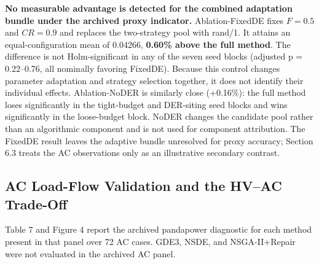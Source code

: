 \documentclass[energies,article,submit,moreauthors]{Definitions/mdpi}
\begin{document}
\textbf{No measurable advantage is detected for the combined adaptation bundle under the archived proxy indicator.} Ablation-FixedDE fixes \(F = 0.5\) and \(CR = 0.9\) and replaces the two-strategy pool with rand/1. It attains an equal-configuration mean of 0.04266, \textbf{0.60\% above the full method}. The difference is not Holm-significant in any of the seven seed blocks (adjusted p = 0.22--0.76, all nominally favoring FixedDE). Because this control changes parameter adaptation and strategy selection together, it does not identify their individual effects. Ablation-NoDER is similarly close (+0.16\%): the full method loses significantly in the tight-budget and DER-siting seed blocks and wins significantly in the loose-budget block. NoDER changes the candidate pool rather than an algorithmic component and is not used for component attribution. The FixedDE result leaves the adaptive bundle unresolved for proxy accuracy; Section 6.3 treats the AC observations only as an illustrative secondary contrast.

\subsection{AC Load-Flow Validation and the HV--AC Trade-Off}\label{ac-load-flow-validation-and-the-hvac-trade-off}

Table 7 and Figure 4 report the archived pandapower diagnostic for each method present in that panel over 72 AC cases. GDE3, NSDE, and NSGA-II+Repair were not evaluated in the archived AC panel.
\end{document}
